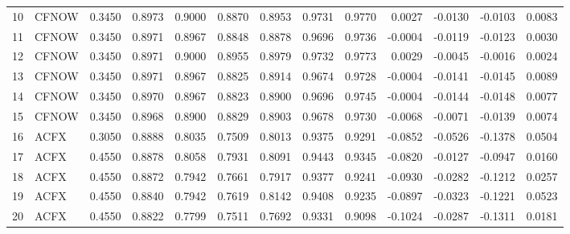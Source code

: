 \begin{tabular}{rlrrrrrrrrrrr}
    10 &  CFNOW &  0.3450 &          0.8973 &  0.9000 &            0.8870 &          0.8953 &     0.9731 &      0.9770 &           0.0027 &        -0.0130 &    -0.0103 &                          0.0083 \\
    11 &  CFNOW &  0.3450 &          0.8971 &  0.8967 &            0.8848 &          0.8878 &     0.9696 &      0.9736 &          -0.0004 &        -0.0119 &    -0.0123 &                          0.0030 \\
    12 &  CFNOW &  0.3450 &          0.8971 &  0.9000 &            0.8955 &          0.8979 &     0.9732 &      0.9773 &           0.0029 &        -0.0045 &    -0.0016 &                          0.0024 \\
    13 &  CFNOW &  0.3450 &          0.8971 &  0.8967 &            0.8825 &          0.8914 &     0.9674 &      0.9728 &          -0.0004 &        -0.0141 &    -0.0145 &                          0.0089 \\
    14 &  CFNOW &  0.3450 &          0.8970 &  0.8967 &            0.8823 &          0.8900 &     0.9696 &      0.9745 &          -0.0004 &        -0.0144 &    -0.0148 &                          0.0077 \\
    15 &  CFNOW &  0.3450 &          0.8968 &  0.8900 &            0.8829 &          0.8903 &     0.9678 &      0.9730 &          -0.0068 &        -0.0071 &    -0.0139 &                          0.0074 \\
    16 &   ACFX &  0.3050 &          0.8888 &  0.8035 &            0.7509 &          0.8013 &     0.9375 &      0.9291 &          -0.0852 &        -0.0526 &    -0.1378 &                          0.0504 \\
    17 &   ACFX &  0.4550 &          0.8878 &  0.8058 &            0.7931 &          0.8091 &     0.9443 &      0.9345 &          -0.0820 &        -0.0127 &    -0.0947 &                          0.0160 \\
    18 &   ACFX &  0.4550 &          0.8872 &  0.7942 &            0.7661 &          0.7917 &     0.9377 &      0.9241 &          -0.0930 &        -0.0282 &    -0.1212 &                          0.0257 \\
    19 &   ACFX &  0.4550 &          0.8840 &  0.7942 &            0.7619 &          0.8142 &     0.9408 &      0.9235 &          -0.0897 &        -0.0323 &    -0.1221 &                          0.0523 \\
    20 &   ACFX &  0.4550 &          0.8822 &  0.7799 &            0.7511 &          0.7692 &     0.9331 &      0.9098 &          -0.1024 &        -0.0287 &    -0.1311 &                          0.0181 \\

\end{tabular}
